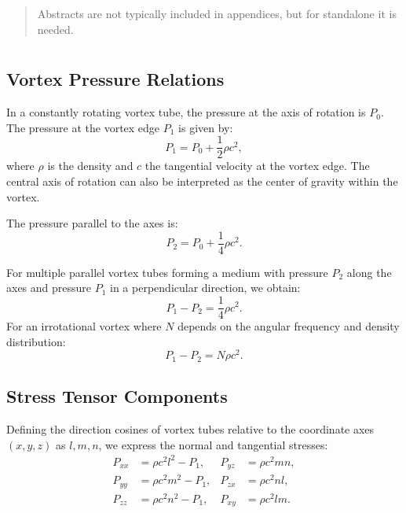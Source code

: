\documentclass[12pt]{article}
\begin{document}
    \titlepageOpen

    \begin{abstract}
        Abstracts are not typically included in appendices, but for standalone it is needed.
    \end{abstract}

    \titlepageClose
    \fi

    \section{\appendixtitle}


    \subsection*{Vortex Pressure Relations}
    In a constantly rotating vortex tube, the pressure at the axis of rotation is $P_0$. The pressure at the vortex edge $P_1$ is given by:
    \begin{equation*}
        P_1 = P_0 + \frac{1}{2} \rho c^2,
    \end{equation*}
    where $\rho$ is the density and $c$ the tangential velocity at the vortex edge. The central axis of rotation can also be interpreted as the center of gravity within the vortex.

    The pressure parallel to the axes is:
    \begin{equation*}
        P_2 = P_0 + \frac{1}{4} \rho c^2.
    \end{equation*}

    For multiple parallel vortex tubes forming a medium with pressure $P_2$ along the axes and pressure $P_1$ in a perpendicular direction, we obtain:
    \begin{equation*}
        P_1 - P_2 = \frac{1}{4} \rho c^2.
    \end{equation*}
    For an irrotational vortex where $N$ depends on the angular frequency and density distribution:
    \begin{equation*}
        P_1 - P_2 = N \rho c^2.
    \end{equation*}

    \subsection*{Stress Tensor Components}
    Defining the direction cosines of vortex tubes relative to the coordinate axes $(x, y, z)$ as $l, m, n$, we express the normal and tangential stresses:
    \begin{align}
        P_{xx} &= \rho c^2 l^2 - P_1, & P_{yz} &= \rho c^2 m n, \\
        P_{yy} &= \rho c^2 m^2 - P_1, & P_{zx} &= \rho c^2 n l, \\
        P_{zz} &= \rho c^2 n^2 - P_1, & P_{xy} &= \rho c^2 l m.
    \end{align}
\end{document}

